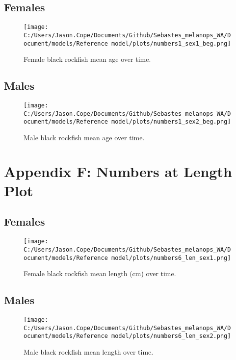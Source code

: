 \documentclass[11pt,
  english,
  letterpaper,
]{article}
\begin{document}
\hypertarget{females}{%
\subsection{Females}\label{females}}

\begin{figure}
\centering
\texttt{[image: C:/Users/Jason.Cope/Documents/Github/Sebastes\_melanops\_WA/Document/models/Reference model/plots/numbers1\_sex1\_beg.png]}
\caption{Female black rockfish mean age over time.\label{fig:num_age_females}}
\end{figure}

\hypertarget{males}{%
\subsection{Males}\label{males}}

\begin{figure}
\centering
\texttt{[image: C:/Users/Jason.Cope/Documents/Github/Sebastes\_melanops\_WA/Document/models/Reference model/plots/numbers1\_sex2\_beg.png]}
\caption{Male black rockfish mean age over time.\label{fig:num_age_males}}
\end{figure}

\clearpage

\hypertarget{app-f}{%
\section{Appendix F: Numbers at Length Plot}\label{app-f}}

\hypertarget{females-1}{%
\subsection{Females}\label{females-1}}

\begin{figure}
\centering
\texttt{[image: C:/Users/Jason.Cope/Documents/Github/Sebastes\_melanops\_WA/Document/models/Reference model/plots/numbers6\_len\_sex1.png]}
\caption{Female black rockfish mean length (cm) over time.\label{fig:num_lts_females}}
\end{figure}

\clearpage

\hypertarget{males-1}{%
\subsection{Males}\label{males-1}}

\begin{figure}
\centering
\texttt{[image: C:/Users/Jason.Cope/Documents/Github/Sebastes\_melanops\_WA/Document/models/Reference model/plots/numbers6\_len\_sex2.png]}
\caption{Male black rockfish mean length over time.\label{fig:num_lts_males}}
\end{figure}

\clearpage
\end{document}
